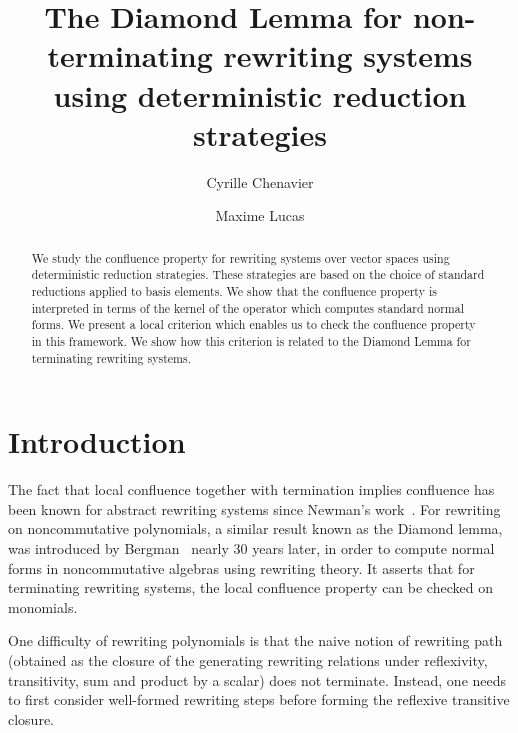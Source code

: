 \documentclass[10pt]{easychair}
\theoremstyle{definition}
\begin{document}
\title{The Diamond Lemma for non-terminating rewriting systems using deterministic reduction strategies}

\author{
Cyrille Chenavier
\and
Maxime Lucas
}



\maketitle

\begin{abstract}
  We study the confluence property for rewriting systems over vector spaces using deterministic reduction strategies. These strategies are based on the choice of standard reductions applied to basis elements. We show that the confluence property is interpreted in terms of the kernel of the operator which computes standard normal forms. We present a local criterion which enables us to check the confluence property in this framework. We show how this criterion is related to the Diamond Lemma for terminating rewriting systems.
\end{abstract}
 
\section{Introduction}

The fact that local confluence together with termination implies confluence has been known for abstract rewriting systems since Newman's work~\cite{MR0007372}. For rewriting on noncommutative polynomials, a similar result known as the Diamond lemma,  was introduced by Bergman~\cite{MR506890} nearly 30 years later, in order to compute normal forms in noncommutative algebras using rewriting theory. It asserts that for terminating rewriting systems, the local confluence property can be checked on monomials. 

One difficulty of rewriting polynomials is that the naive notion of rewriting path (obtained as the closure of the generating rewriting relations under reflexivity, transitivity, sum and product by a scalar) does not terminate. Instead, one needs to first consider well-formed rewriting steps before forming the reflexive transitive closure.
\end{document}
